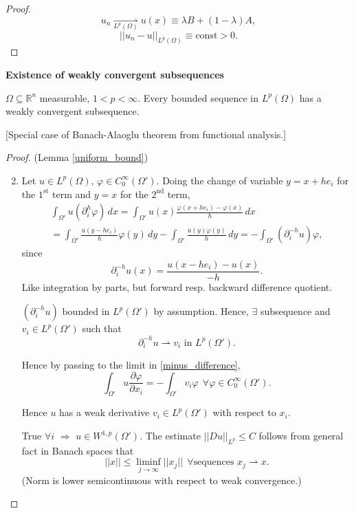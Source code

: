 \documentclass[12pt]{article}
\theoremstyle{definition}
\begin{document}
\begin{proof}
\[u_n\underset{L^p(\Omega)}\rightharpoonup u(x)\equiv\lambda B+(1-\lambda)A,\]
\[||u_n-u||_{L^p(\Omega)}\equiv\text{const}>0.\]
\end{proof}

\textbf{Existence of weakly convergent subsequences}

$\Omega\subseteq\mathbb R^n$ measurable, $1<p<\infty$. Every bounded sequence in $L^p(\Omega)$ has a weakly convergent subsequence.

[Special case of Banach-Alaoglu theorem from functional analysis.]

\begin{proof}
(Lemma \ref{uniform_bound})
\begin{enumerate}[label=(\roman*)]
\setcounter{enumi}{1}
\item Let $u\in L^p(\Omega)$, $\varphi\in C_0^\infty(\Omega')$. Doing the change of variable $y=x+he_i$ for the $1^\text{st}$ term and $y=x$ for the $2^\text{nd}$ term,
\begin{multline}\tag{$*$}\label{minus_difference}
\int_{\Omega'}u(\partial_i^h\varphi)\,dx=\int_{\Omega'}u(x)\frac{\varphi(x+he_i)-\varphi(x)}h\,dx\\
=\int_{\Omega'}\frac{u(y-he_i)}h\varphi(y)\,dy-\int_{\Omega'}\frac{u(y)\varphi(y)}h\,dy=-\int_{\Omega'}(\partial_i^{-h}u)\varphi,
\end{multline}
since
\[\partial_i^{-h}u(x)=\frac{u(x-he_i)-u(x)}{-h}.\]
Like integration by parts, but forward resp. backward difference quotient.

$(\partial_i^{-h}u)$ bounded in $L^p(\Omega')$ by assumption. Hence, $\exists$ subsequence and $v_i\in L^p(\Omega')$ such that
\[\partial_i^{-h}u\rightharpoonup v_i\text{ in }L^p(\Omega').\]

Hence by passing to the limit in \eqref{minus_difference},
\[\int_{\Omega'}u\frac{\partial\varphi}{\partial x_i}=-\int_{\Omega'}v_i\varphi\ \ \forall\varphi\in C_0^\infty(\Omega').\]

Hence $u$ has a weak derivative $v_i\in L^p(\Omega')$ with respect to $x_i$.

True $\forall i$ $\Rightarrow$ $u\in W^{1,p}(\Omega')$. The estimate $||Du||_{L^p}\leq C$ follows from general fact in Banach spaces that
\[||x||\leq\liminf_{j\to\infty}||x_j||\ \ \forall\text{sequences }x_j\rightharpoonup x.\]
(Norm is lower semicontinuous with respect to weak convergence.)
\end{enumerate}
\end{proof}
\end{document}
